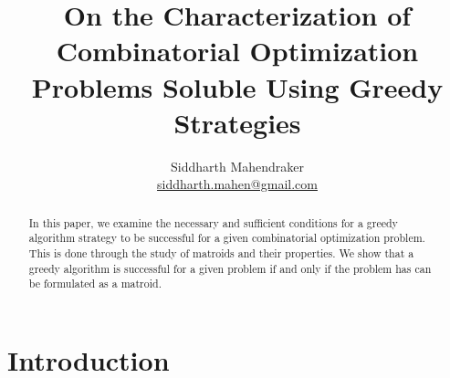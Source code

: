 \documentclass[a4paper,11pt]{report}
\theoremstyle{plain}
\theoremstyle{definition}
\begin{document}
\title{On the Characterization of Combinatorial Optimization Problems Soluble Using Greedy Strategies}
\author{Siddharth Mahendraker\\
    \url{siddharth.mahen@gmail.com}}

\maketitle

\begin{abstract}
In this paper, we examine the necessary and sufficient conditions for a greedy
algorithm strategy to be successful for a given combinatorial optimization
problem. This is done through the study of matroids and their properties. We
show that a greedy algorithm is successful for a given problem if and only if
the problem has can be formulated as a matroid.
\end{abstract}

\setcounter{secnumdepth}{3}
\renewcommand{\thesection}{\arabic{section}}

\renewcommand{\cfttoctitlefont}{\Large\bfseries}
\setlength\cftaftertoctitleskip{1em}
\setlength\cftbeforesecskip{0.5em}

\setcounter{page}{1}
\tableofcontents
\clearpage
\setcounter{page}{1}

\section{Introduction}
\end{document}
